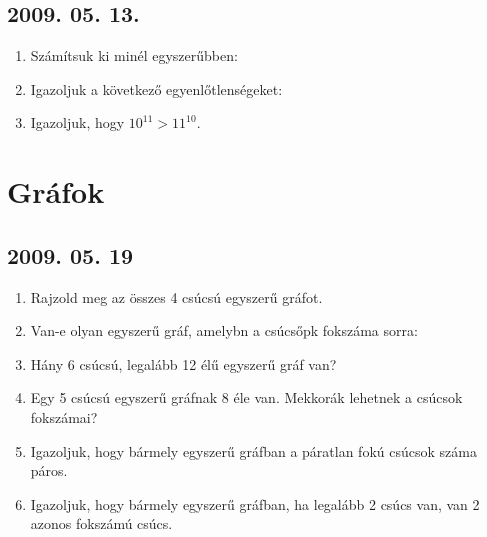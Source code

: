 \subsection*{2009. 05. 13.}
\begin{enumerate}

\item Számítsuk ki minél egyszerűbben:
\item Igazoljuk a következő egyenlőtlenségeket:

\item Igazoljuk, hogy $10^{11}>11^{10}$.
\end{enumerate}


\section{Gráfok}

\subsection*{2009. 05. 19}
\begin{enumerate}
\item Rajzold meg az összes 4 csúcsú egyszerű gráfot.
\item Van-e olyan egyszerű gráf, amelybn a csúcsőpk fokszáma sorra: 
\item Hány 6 csúcsú, legalább 12 élű egyszerű gráf van?
\item Egy 5 csúcsú egyszerű gráfnak 8 éle van. Mekkorák lehetnek a csúcsok fokszámai?
\item Igazoljuk, hogy bármely egyszerű gráfban a  páratlan fokú csúcsok száma páros.
\item Igazoljuk, hogy bármely egyszerű gráfban, ha legalább 2 csúcs van, van 2 azonos fokszámú csúcs.
\end{enumerate}


